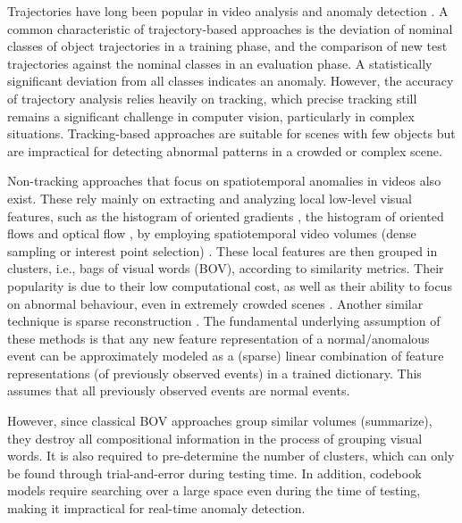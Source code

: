 \documentclass[a4paper]{article}
\begin{document}
Trajectories have long been popular in video analysis and anomaly detection \cite{zhou2015,li2011,piciarelli2008,mo2014}.  A common characteristic of trajectory-based approaches is the deviation of nominal classes of object trajectories in a training phase, and the comparison of new test trajectories against the nominal classes in an evaluation phase. A statistically significant deviation from all classes indicates an anomaly. However, the accuracy of trajectory analysis relies heavily on tracking, which precise tracking still remains a significant challenge in computer vision, particularly in complex situations. Tracking-based approaches are suitable for scenes with few objects but are impractical for detecting abnormal patterns in a crowded or complex scene.

Non-tracking approaches that focus on spatiotemporal anomalies in videos also exist. These rely mainly on extracting and analyzing local low-level visual features, such as the histogram of oriented gradients \cite{xiao2015}, the histogram of oriented flows \cite{laptev2008} and optical flow \cite{reddy2011}, by employing spatiotemporal video volumes (dense sampling or interest point selection) \cite{dollar2005}. These local features are then grouped in clusters, i.e., bags of visual words (BOV), according to similarity metrics. Their popularity is due to their low computational cost, as well as their ability to focus on abnormal behaviour, even in extremely crowded scenes \cite{kratz2009}. Another similar technique is sparse reconstruction \cite{cong2011,zhao2011}. The fundamental underlying assumption of these methods is that any new feature representation of a normal/anomalous event can be approximately modeled as a (sparse) linear combination of feature representations (of previously observed events) in a trained dictionary. This assumes that all previously observed events are normal events. 

However, since classical BOV approaches group similar volumes (summarize), they destroy all compositional information in the process of grouping visual words. It is also required to pre-determine the number of clusters, which can only be found through trial-and-error during testing time. In addition, codebook models require searching over a large space \cite{roshtkhari2013} even during the time of testing, making it impractical for real-time anomaly detection. 
\end{document}

